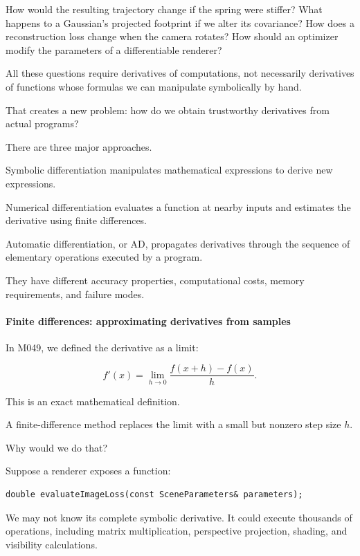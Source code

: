 How would the resulting trajectory change if the spring were stiffer? What happens to a Gaussian's projected footprint if we alter its covariance? How does a reconstruction loss change when the camera rotates? How should an optimizer modify the parameters of a differentiable renderer?

All these questions require derivatives of computations, not necessarily derivatives of functions whose formulas we can manipulate symbolically by hand.

That creates a new problem: how do we obtain trustworthy derivatives from actual programs?

There are three major approaches.

Symbolic differentiation manipulates mathematical expressions to derive new expressions.

Numerical differentiation evaluates a function at nearby inputs and estimates the derivative using finite differences.

Automatic differentiation, or AD, propagates derivatives through the sequence of elementary operations executed by a program.

They have different accuracy properties, computational costs, memory requirements, and failure modes.

\paragraph{Finite differences: approximating derivatives from samples}\label{02-foundations-ii-ch025-finite-differences-approximating-derivatives-from-samples}

\hypertarget{02-foundations-ii-ch025-finite-differences-approximating-derivatives-from-samples}{}

In M049, we defined the derivative as a limit:

\[
f'(x)= \lim_{h\to0} \frac{f(x+h)-f(x)}h.
\]

This is an exact mathematical definition.

A finite-difference method replaces the limit with a small but nonzero step size \(h\).

Why would we do that?

Suppose a renderer exposes a function:

\begin{verbatim}
double evaluateImageLoss(const SceneParameters& parameters);
\end{verbatim}

We may not know its complete symbolic derivative. It could execute thousands of operations, including matrix multiplication, perspective projection, shading, and visibility calculations.

